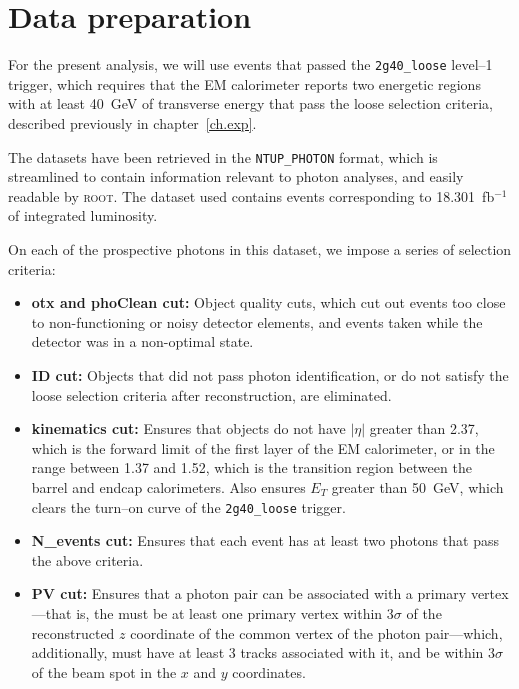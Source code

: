 \chapter{Data preparation \label{ch.data}}

For the present analysis, we will use events that passed the \texttt{2g40\_loose} level--1 trigger, which requires that the EM calorimeter reports two energetic regions with at least 40~GeV of transverse energy that pass the loose selection criteria, described previously in chapter~\ref{ch.exp}.

The datasets have been retrieved in the \texttt{NTUP\_PHOTON} format, which is streamlined to contain information relevant to photon analyses, and easily readable by \textsc{root}. The dataset used contains events corresponding to 18.301~fb$^{-1}$ of integrated luminosity.

On each of the prospective photons in this dataset, we impose a series of selection criteria:

\begin{itemize}
\item \textbf{otx and phoClean cut:} Object quality cuts, which cut out events too close to non-functioning or noisy detector elements, and events taken while the detector was in a non-optimal state.
\item \textbf{ID cut:} Objects that did not pass photon identification, or do not satisfy the loose selection criteria after reconstruction, are eliminated.
\item \textbf{kinematics cut:} Ensures that objects do not have $|\eta|$ greater than 2.37, which is the forward limit of the first layer of the EM calorimeter, or in the range between 1.37 and 1.52, which is the transition region between the barrel and endcap calorimeters. Also ensures $E_T$ greater than 50~GeV, which clears the turn--on curve of the \texttt{2g40\_loose} trigger.
\item \textbf{N\_events cut:} Ensures that each event has at least two photons that pass the above criteria.
\item \textbf{PV cut:} Ensures that a photon pair can be associated with a primary vertex---that is, the must be at least one primary vertex within 3$\sigma$ of the reconstructed $z$ coordinate of the common vertex of the photon pair---which, additionally, must have at least 3 tracks associated with it, and be within 3$\sigma$ of the beam spot in the $x$ and $y$ coordinates.

\end{itemize}

